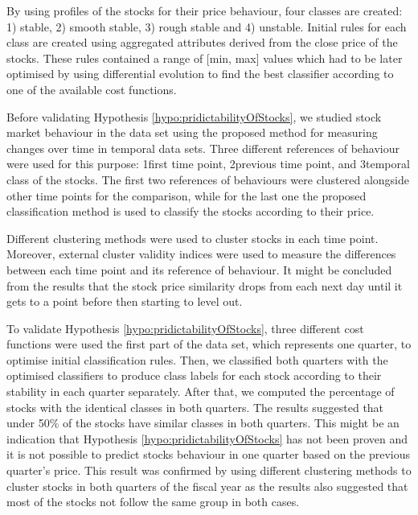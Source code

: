 By using profiles of the stocks for their price behaviour, four classes are created: 1) stable, 2) smooth stable, 3) rough stable and 4) unstable. Initial rules for each class are created using aggregated attributes derived from the close price of the stocks. These rules contained a range of [min, max] values which had to be later optimised by using differential evolution to find the best classifier according to one of the available cost functions.

Before validating Hypothesis \ref{hypo:pridictabilityOfStocks}, we studied stock market behaviour in the data set using the proposed method for measuring changes over time in temporal data sets. Three different references of behaviour were used for this purpose: 1first time point, 2previous time point, and 3temporal class of the stocks. The first two references of behaviours were clustered alongside other time points for the comparison, while for the last one the proposed classification method is used to classify the stocks according to their price.

Different clustering methods were used to cluster stocks in each time point. Moreover, external cluster validity indices were used to measure the differences between each time point and its reference of behaviour.   It might be concluded from the results that the stock price similarity drops from each next day until it gets to a point before then starting to level out.

To validate Hypothesis \ref{hypo:pridictabilityOfStocks}, three different cost functions were used the first part of the data set, which represents one quarter, to optimise initial classification rules. Then, we classified both quarters with the optimised classifiers to produce class labels for each stock according to their stability in each quarter separately. After that, we computed the percentage of stocks with the identical classes in both quarters. The results suggested that under 50\% of the stocks have similar classes in both quarters.  This might be an indication that Hypothesis \ref{hypo:pridictabilityOfStocks} has not been proven and it is not possible to predict stocks behaviour in one quarter based on the previous quarter's price. This result was confirmed by using different clustering methods to cluster stocks in both quarters of the fiscal year as the results also suggested that most of the stocks not follow the same group in both cases.


